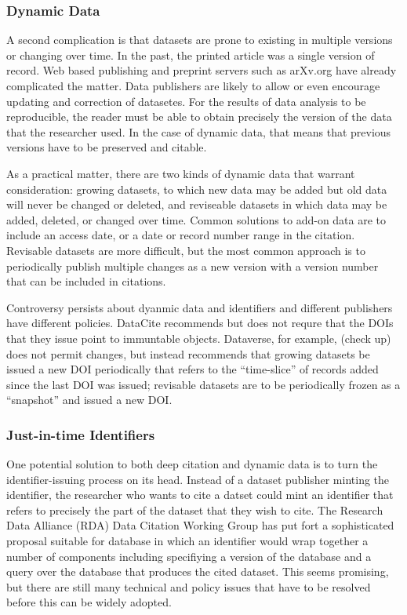 \documentclass{article}
\begin{document}
\subsubsection{Dynamic Data}\label{dynamic-data}

A second complication is that datasets are prone to existing in multiple versions or changing over time.
In the past, the printed article was a single version of record.
Web based publishing and preprint servers such as arXv.org have already complicated the matter.
Data publishers are likely to allow or even encourage updating and correction of datasetes.
For the results of data analysis to be reproducible, the reader must be able to obtain precisely the version of the data that the researcher used.
In the case of dynamic data, that means that previous versions have to be preserved and citable.

As a practical matter, there are two kinds of dynamic data that warrant consideration: growing datasets, to which new data may be added but old data will never be changed or deleted, and reviseable datasets in which data may be added, deleted, or changed over time.
Common solutions to add-on data are to include an access date, or a date or record number range in the citation.
Revisable datasets are more difficult, but the most common approach is to periodically publish multiple changes as a new version with a version number that can be included in citations.

Controversy persists about dyanmic data and identifiers and different publishers have different policies.
DataCite recommends but does not requre that the DOIs that they issue point to immuntable objects. Dataverse, for example, (check up) does not permit changes, but instead recommends that growing datasets be issued a new DOI periodically that refers to the ``time-slice'' of records added since the last DOI was issued; revisable datasets are to be periodically frozen as a ``snapshot'' and issued a new DOI.

\subsubsection{Just-in-time Identifiers}\label{just-in-time-identifiers}

One potential solution to both deep citation and dynamic data is to turn the identifier-issuing process on its head.
Instead of a dataset publisher minting the identifier, the researcher who wants to cite a datset could mint an identifier that refers to precisely the part of the dataset that they wish to cite.
The Research Data Alliance (RDA) Data Citation Working Group has put fort a sophisticated proposal suitable for database in which an identifier would wrap together a number of components including specifiying a version of the database and a query over the database that produces the cited dataset.
This seems promising, but there are still many technical and policy issues that have to be resolved before this can be widely adopted.
\end{document}
